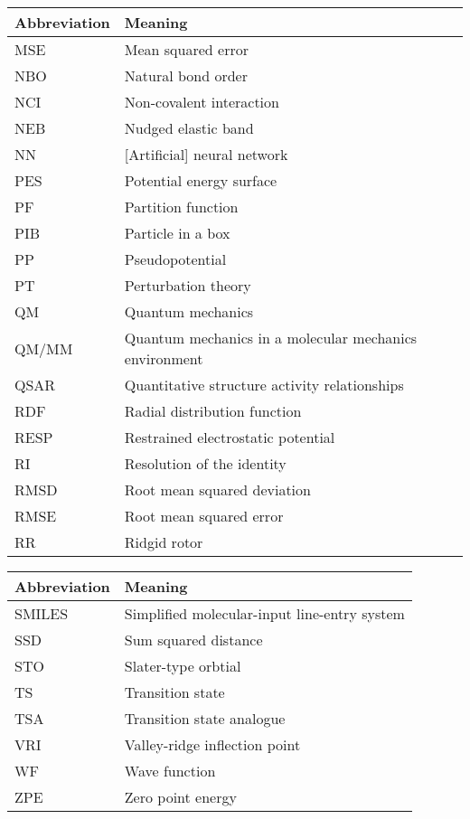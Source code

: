 \documentclass[../main.tex]{subfiles}
\begin{document}
\begin{table}[h!]
\def\arraystretch{2.0}
\begin{tabularx}{\textwidth}{YY}
Abbreviation & Meaning \\
\hline
MSE	&	Mean squared error	\\
NBO	&	Natural bond order	\\
NCI	&	Non-covalent interaction	\\
NEB	&	Nudged elastic band	\\
NN	&	[Artificial] neural network	\\
PES	&	Potential energy surface	\\
PF	&	Partition function	\\
PIB	&	Particle in a box	\\
PP	&	Pseudopotential	\\
PT	&	Perturbation theory	\\
QM	&	Quantum mechanics	\\
QM/MM	&	Quantum mechanics in a molecular mechanics environment	\\
QSAR	&	Quantitative structure activity relationships	\\
RDF	&	Radial distribution function	\\
RESP	&	Restrained electrostatic potential	\\
RI	&	Resolution of the identity	\\
RMSD	&	Root mean squared deviation	\\
RMSE	&	Root mean squared error	\\
RR	&	Ridgid rotor	\\
\end{tabularx}
\end{table}
\newpage
\begin{table}[h!]
\def\arraystretch{2.0}
\begin{tabularx}{\textwidth}{YY}
Abbreviation & Meaning \\
\hline
SMILES	&	Simplified molecular-input line-entry system	\\
SSD	&	Sum squared distance	\\
STO	&	Slater-type orbtial	\\
TS	&	Transition state	\\
TSA	&	Transition state analogue	\\
VRI	&	Valley-ridge inflection point	\\
WF	&	Wave function	\\
ZPE	&	Zero point energy	\\
\end{tabularx}
\end{table}
\clearpage
\end{document}
